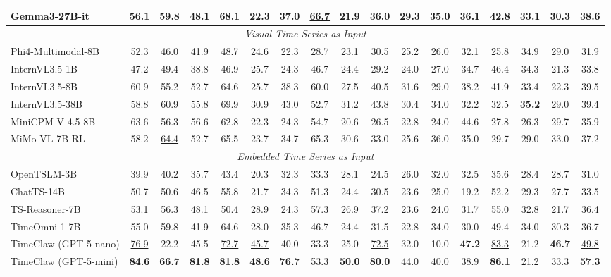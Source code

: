 \begin{table}[t]
{\begin{tabular}{l|cccc|ccccccc|cc|cc|c}
Gemma3-27B-it            & 56.1 & 59.8 & 48.1 & 68.1 & 22.3 & 37.0 & \underline{66.7} & 21.9 & 36.0 & 29.3 & 35.0 & 36.1 & 42.8 & 33.1 & 30.3 & 38.6 \\
\midrule
\multicolumn{17}{c}{\textit{Visual Time Series as Input}} \\
\midrule
Phi4-Multimodal-8B       & 52.3 & 46.0 & 41.9 & 48.7 & 24.6 & 22.3 & 28.7 & 23.1 & 30.5 & 25.2 & 26.0 & 32.1 & 25.8 & \underline{34.9} & 29.0 & 31.9 \\
InternVL3.5-1B           & 47.2 & 49.4 & 38.8 & 46.9 & 25.7 & 24.3 & 46.7 & 24.4 & 29.2 & 24.0 & 27.0 & 34.7 & 46.4 & 34.3 & 21.3 & 33.8 \\
InternVL3.5-8B           & 60.9 & 55.2 & 52.7 & 64.6 & 25.7 & 38.3 & 60.0 & 27.5 & 40.5 & 31.6 & 29.0 & 38.2 & 41.9 & 33.4 & 22.3 & 39.5 \\
InternVL3.5-38B          & 58.8 & 60.9 & 55.8 & 69.9 & 30.9 & 43.0 & 52.7 & 31.2 & 43.8 & 30.4 & 34.0 & 32.2 & 32.5 & \textbf{35.2} & 29.0 & 39.4 \\
MiniCPM-V-4.5-8B         & 63.6 & 56.3 & 56.6 & 62.8 & 22.3 & 24.3 & 54.7 & 20.6 & 26.5 & 22.8 & 24.0 & 44.6 & 27.8 & 26.3 & 29.7 & 35.9 \\
MiMo-VL-7B-RL            & 58.2 & \underline{64.4} & 52.7 & 65.5 & 23.7 & 34.7 & 65.3 & 30.6 & 33.0 & 25.6 & 36.0 & 35.0 & 29.7 & 29.0 & 33.0 & 37.2 \\
\midrule
\multicolumn{17}{c}{\textit{Embedded Time Series as Input}} \\
\midrule
OpenTSLM-3B      & 39.9 & 40.2 & 35.7 & 43.4 & 20.3 & 32.3 & 33.3 & 28.1 & 24.5 & 26.0 & 32.0 & 32.5 & 35.6 & 28.4 & 28.7 & 31.0 \\
ChatTS-14B               & 50.7 & 50.6 & 46.5 & 55.8 & 21.7 & 34.3 & 51.3 & 24.4 & 30.5 & 23.6 & 25.0 & 19.2 & 52.2 & 29.3 & 27.7 & 33.5 \\
TS-Reasoner-7B           & 53.1 & 56.3 & 48.1 & 50.4 & 28.9 & 24.3 & 57.3 & 26.9 & 37.2 & 23.6 & 24.0 & 31.7 & 55.0 & 32.8 & 21.7 & 36.4 \\
TimeOmni-1-7B            & 55.0 & 59.8 & 41.9 & 64.6 & 28.0 & 35.3 & 46.7 & 24.4 & 31.5 & 22.8 & 34.0 & 30.0 & 49.4 & 34.0 & 30.3 & 36.7 \\
\midrule
TimeClaw (GPT-5-nano)    & \underline{76.9} & 22.2 & 45.5 & \underline{72.7} & \underline{45.7} & 40.0 & 33.3 & 25.0 & \underline{72.5} & 32.0 & 10.0 & \textbf{47.2} & \underline{83.3} & 21.2 & \textbf{46.7} & \underline{49.8} \\
TimeClaw (GPT-5-mini)    & \textbf{84.6} & \textbf{66.7} & \textbf{81.8} & \textbf{81.8} & \textbf{48.6} & \textbf{76.7} & 53.3 & \textbf{50.0} & \textbf{80.0} & \underline{44.0} & \underline{40.0} & 38.9 & \textbf{86.1} & 21.2 & \underline{33.3} & \textbf{57.3} \\
\bottomrule
\end{tabular}
}
\label{tab:tsrbench_ap_open}
\end{table}
\renewcommand{\arraystretch}{1.0}